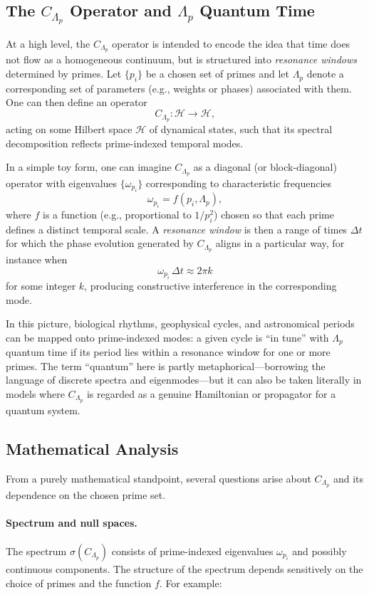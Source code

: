 \documentclass[12]{amsart}
\theoremstyle{plain}
\begin{document}
\subsection{The $C_{\Lambda_p}$ Operator and $\Lambda_p$ Quantum Time}

At a high level, the $C_{\Lambda_p}$ operator is intended to encode the idea that time does not flow as a homogeneous continuum, but is structured into \emph{resonance windows} determined by primes. Let $\{p_i\}$ be a chosen set of primes and let $\Lambda_p$ denote a corresponding set of parameters (e.g., weights or phases) associated with them. One can then define an operator
\[
  C_{\Lambda_p} : \mathcal{H} \to \mathcal{H},
\]
acting on some Hilbert space $\mathcal{H}$ of dynamical states, such that its spectral decomposition reflects prime-indexed temporal modes.

In a simple toy form, one can imagine $C_{\Lambda_p}$ as a diagonal (or block-diagonal) operator with eigenvalues $\{\omega_{p_i}\}$ corresponding to characteristic frequencies
\[
  \omega_{p_i} = f(p_i, \Lambda_p),
\]
where $f$ is a function (e.g., proportional to $1/p_i^2$) chosen so that each prime defines a distinct temporal scale. A \emph{resonance window} is then a range of times $\Delta t$ for which the phase evolution generated by $C_{\Lambda_p}$ aligns in a particular way, for instance when
\[
  \omega_{p_i}\,\Delta t \approx 2\pi k
\]
for some integer $k$, producing constructive interference in the corresponding mode.

In this picture, biological rhythms, geophysical cycles, and astronomical periods can be mapped onto prime-indexed modes: a given cycle is ``in tune'' with $\Lambda_p$ quantum time if its period lies within a resonance window for one or more primes. The term ``quantum'' here is partly metaphorical—borrowing the language of discrete spectra and eigenmodes—but it can also be taken literally in models where $C_{\Lambda_p}$ is regarded as a genuine Hamiltonian or propagator for a quantum system.

\subsection{Mathematical Analysis}

From a purely mathematical standpoint, several questions arise about $C_{\Lambda_p}$ and its dependence on the chosen prime set.

\paragraph{Spectrum and null spaces.} The spectrum $\sigma(C_{\Lambda_p})$ consists of prime-indexed eigenvalues $\omega_{p_i}$ and possibly continuous components. The structure of the spectrum depends sensitively on the choice of primes and the function $f$. For example:
\end{document}
